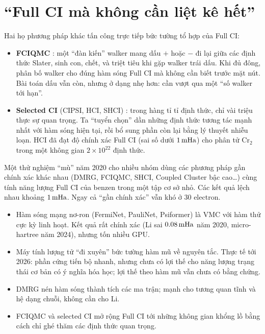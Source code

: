 \section{``Full CI mà không cần liệt kê hết''}
Hai họ phương pháp khác tấn công trực tiếp bức tường tổ hợp của Full CI:
\begin{itemize}
\item \textbf{FCIQMC} \cite{Booth2009}: một ``đàn kiến'' walker mang dấu $+$ hoặc $-$ đi lại giữa các định thức Slater, sinh con, chết, và triệt tiêu khi gặp walker trái dấu. Khi đủ đông, phân bố walker cho đúng hàm sóng Full CI mà không cần biết trước mặt nút. Bài toán dấu vẫn còn, nhưng ở dạng nhẹ hơn: cần vượt qua một ``số walker tới hạn''.
\item \textbf{Selected CI} (CIPSI, HCI, SHCI) \cite{Holmes2016}: trong hàng tỉ tỉ định thức, chỉ vài triệu thực sự quan trọng. Ta ``tuyển chọn'' dần những định thức tương tác mạnh nhất với hàm sóng hiện tại, rồi bổ sung phần còn lại bằng lý thuyết nhiễu loạn. HCI đã đạt độ chính xác Full CI (sai số dưới $1\,\mathrm{mHa}$) cho phân tử Cr$_2$ trong một không gian $2\times10^{22}$ định thức.
\end{itemize}
Một thử nghiệm ``mù'' năm 2020 \cite{Eriksen2020} cho nhiều nhóm dùng các phương pháp gần chính xác khác nhau (DMRG, FCIQMC, SHCI, Coupled Cluster bậc cao\ldots) cùng tính năng lượng Full CI của benzen trong một tập cơ sở nhỏ. Các kết quả lệch nhau khoảng $1\,\mathrm{mHa}$. Ngay cả ``gần chính xác'' vẫn khó ở 30 electron.

\begin{ghinho}
\begin{itemize}
\item Hàm sóng mạng nơ-ron (FermiNet, PauliNet, Psiformer) là VMC với hàm thử cực kỳ linh hoạt. Kết quả rất chính xác (Li sai $0.08\,\mathrm{mHa}$ năm 2020, micro-hartree năm 2024), nhưng tốn nhiều GPU.
\item Máy tính lượng tử ``đi xuyên'' bức tường hàm mũ về nguyên tắc. Thực tế tới 2026: phần cứng tiến bộ nhanh, nhưng chưa có lợi thế cho năng lượng trạng thái cơ bản có ý nghĩa hóa học; lợi thế theo hàm mũ vẫn chưa có bằng chứng.
\item DMRG nén hàm sóng thành tích các ma trận; mạnh cho tương quan tĩnh và hệ dạng chuỗi, không cần cho Li.
\item FCIQMC và selected CI mở rộng Full CI tới những không gian khổng lồ bằng cách chỉ ghé thăm các định thức quan trọng.
\end{itemize}
\end{ghinho}
